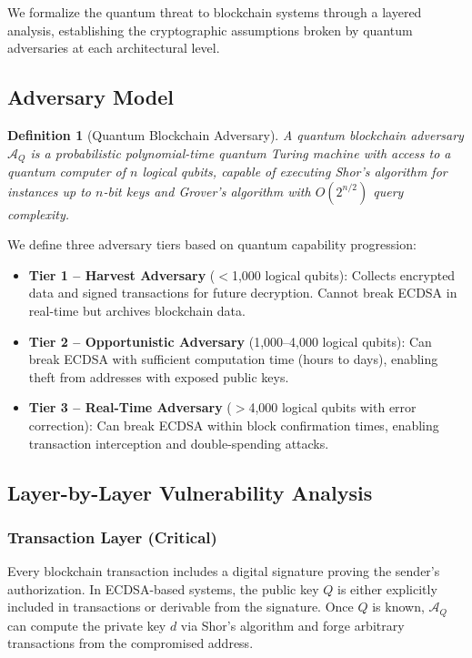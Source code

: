 \documentclass[12pt, a4paper, twocolumn]{article}
\newtheorem{definition}{Definition}
\begin{document}
We formalize the quantum threat to blockchain systems through a layered analysis, establishing the cryptographic assumptions broken by quantum adversaries at each architectural level.

\subsection{Adversary Model}

\begin{definition}[Quantum Blockchain Adversary]
A quantum blockchain adversary $\mathcal{A}_Q$ is a probabilistic polynomial-time quantum Turing machine with access to a quantum computer of $n$ logical qubits, capable of executing Shor's algorithm for instances up to $n$-bit keys and Grover's algorithm with $O(2^{n/2})$ query complexity.
\end{definition}

We define three adversary tiers based on quantum capability progression:

\begin{itemize}[noitemsep]
  \item \textbf{Tier 1 -- Harvest Adversary} ($<$1,000 logical qubits): Collects encrypted data and signed transactions for future decryption. Cannot break ECDSA in real-time but archives blockchain data.
  \item \textbf{Tier 2 -- Opportunistic Adversary} (1,000--4,000 logical qubits): Can break ECDSA with sufficient computation time (hours to days), enabling theft from addresses with exposed public keys.
  \item \textbf{Tier 3 -- Real-Time Adversary} ($>$4,000 logical qubits with error correction): Can break ECDSA within block confirmation times, enabling transaction interception and double-spending attacks.
\end{itemize}

\subsection{Layer-by-Layer Vulnerability Analysis}

\subsubsection{Transaction Layer (Critical)}
Every blockchain transaction includes a digital signature proving the sender's authorization. In ECDSA-based systems, the public key $Q$ is either explicitly included in transactions or derivable from the signature. Once $Q$ is known, $\mathcal{A}_Q$ can compute the private key $d$ via Shor's algorithm and forge arbitrary transactions from the compromised address.
\end{document}
